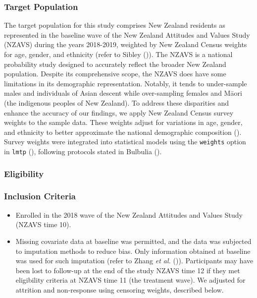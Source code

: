 \documentclass[
  single column]{article}
\providecommand{\tightlist}{%
  \setlength{\itemsep}{0pt}\setlength{\parskip}{0pt}}\usepackage{longtable,booktabs,array}
\begin{document}
\subsubsection{Target Population}\label{target-population}

The target population for this study comprises New Zealand residents as
represented in the baseline wave of the New Zealand Attitudes and Values
Study (NZAVS) during the years 2018-2019, weighted by New Zealand Census
weights for age, gender, and ethnicity (refer to Sibley
()). The NZAVS is a national probability
study designed to accurately reflect the broader New Zealand population.
Despite its comprehensive scope, the NZAVS does have some limitations in
its demographic representation. Notably, it tends to under-sample males
and individuals of Asian descent while over-sampling females and Māori
(the indigenous peoples of New Zealand). To address these disparities
and enhance the accuracy of our findings, we apply New Zealand Census
survey weights to the sample data. These weights adjust for variations
in age, gender, and ethnicity to better approximate the national
demographic composition (). Survey
weights were integrated into statistical models using the
\texttt{weights} option in \texttt{lmtp}
(), following
protocols stated in Bulbulia
().

\subsubsection{Eligibility}\label{eligibility}

\subsubsection{Inclusion Criteria}\label{inclusion-criteria}

\begin{itemize}
\tightlist
\item
  Enrolled in the 2018 wave of the New Zealand Attitudes and Values
  Study (NZAVS time 10).
\item
  Missing covariate data at baseline was permitted, and the data was
  subjected to imputation methods to reduce bias. Only information
  obtained at baseline was used for such imputation (refer to Zhang
  \emph{et al.}
  ()).
  Participants may have been lost to follow-up at the end of the study
  NZAVS time 12 if they met eligibility criteria at NZAVS time 11 (the
  treatment wave). We adjusted for attrition and non-response using
  censoring weights, described below.
\end{itemize}
\end{document}
